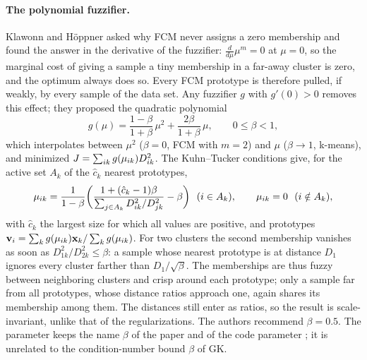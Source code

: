 \paragraph{The polynomial fuzzifier.} Klawonn and H\"oppner \cite{klawonn:2003:fuzzifier} asked why FCM never assigns a zero membership and found the answer in the derivative of the fuzzifier: $\frac{d}{d\mu}\mu^m=0$ at $\mu=0$, so the marginal cost of giving a sample a tiny membership in a far-away cluster is zero, and the optimum always does so. Every FCM prototype is therefore pulled, if weakly, by every sample of the data set. Any fuzzifier $g$ with $g'(0)>0$ removes this effect; they proposed the quadratic polynomial
\begin{equation}
  g(\mu)=\frac{1-\beta}{1+\beta}\,\mu^2+\frac{2\beta}{1+\beta}\,\mu,\qquad 0\le\beta<1,
  \label{eq:part:polyfuzzifier}
\end{equation}
which interpolates between $\mu^2$ ($\beta=0$, FCM with $m=2$) and $\mu$ ($\beta\to1$, k-means), and minimized $J=\sum_{ik}g(\mu_{ik})D^2_{ik}$. The Kuhn--Tucker conditions give, for the active set $A_k$ of the $\hat c_k$ nearest prototypes,
\begin{equation}
  \mu_{ik}=\frac{1}{1-\beta}\biggl(\frac{1+(\hat c_k-1)\beta}{\sum_{j\in A_k}D^2_{ik}/D^2_{jk}}-\beta\biggr)\ \ (i\in A_k),\qquad\mu_{ik}=0\ \ (i\notin A_k),
  \label{eq:part:mupoly}
\end{equation}
with $\hat c_k$ the largest size for which all values are positive, and prototypes $\mathbf{v}_i=\sum_kg(\mu_{ik})\mathbf{x}_k/\sum_kg(\mu_{ik})$. For two clusters the second membership vanishes as soon as $D^2_{1k}/D^2_{2k}\le\beta$: a sample whose nearest prototype is at distance $D_1$ ignores every cluster farther than $D_1/\sqrt\beta$. The memberships are thus fuzzy between neighboring clusters and crisp around each prototype; only a sample far from all prototypes, whose distance ratios approach one, again shares its membership among them. The distances still enter as ratios, so the result is scale-invariant, unlike that of the regularizations. The authors recommend $\beta=0.5$. The parameter keeps the name $\beta$ of the paper and of the code parameter ; it is unrelated to the condition-number bound $\beta$ of GK.

